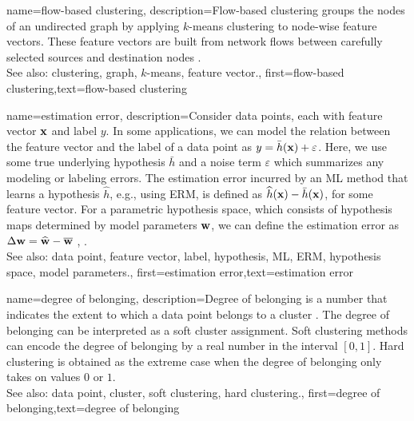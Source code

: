 {name={flow-based clustering},
	description={Flow-based clustering groups the nodes 
		of an undirected graph by applying $k$-means clustering to node-wise 
		feature vectors. These feature vectors are built from network flows between 
		carefully selected sources and destination nodes \cite{FlowSpecClustering2021}. 
					\\ 
		See also: clustering, graph, $k$-means, feature vector.}, 
	first={flow-based clustering},text={flow-based clustering} 
}



{name={estimation error},
	description={Consider data points, each with feature vector ${\bf x}$ and label 
		$y$. In some applications, we can model the relation between the feature vector and the label
		of a data point as $y = \bar{h}({\bf x}) + \varepsilon$. Here, we 
		use some true underlying hypothesis $\bar{h}$ and a noise term $\varepsilon$ 
		which summarizes any modeling or labeling errors. The estimation error incurred by an ML 
		method that learns a hypothesis $\widehat{h}$, e.g., using ERM, is defined as 
		$\widehat{h}({\bf x}) - \bar{h}({\bf x})$, for some feature vector. 
		For a parametric hypothesis space, which consists of hypothesis maps determined by 
		model parameters ${\bf w}$, we can define the estimation error as $\Delta {\bf w} = \widehat{{\bf w}} - \overline{{\bf w}}$ \cite{kay}, \cite{hastie01statisticallearning}.
					\\ 
		See also: data point, feature vector, label, hypothesis, ML, ERM, hypothesis space, model parameters.},
	first={estimation error},text={estimation error} 
}


{name={degree of belonging},
	description={Degree of belonging is a number that indicates the extent to which a data point 
		belongs to a cluster \cite[Ch. 8]{MLBasics}. The degree of belonging can be 
		interpreted as a soft cluster assignment. Soft clustering methods can 
		encode the degree of belonging by a real number in the interval $[0,1]$. 
		Hard clustering is obtained as the extreme case when the degree of belonging 
		only takes on values $0$ or $1$.
					\\ 
		See also: data point, cluster, soft clustering, hard clustering.}, first={degree of belonging},text={degree of belonging} 
}


